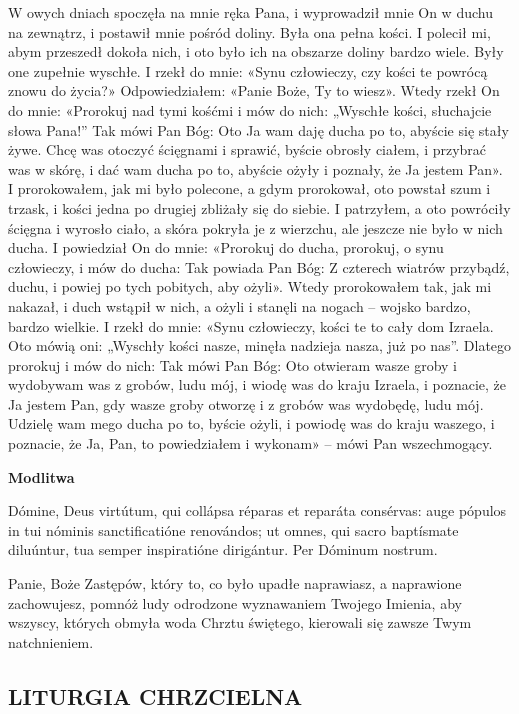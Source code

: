 \documentclass[10pt,a5paper]{book}
\newcommand{\oremus}[3]{\medskip\centerline{\textbf{#1}}\medskip
	\begin{sloppypar}
		\begin{paracol}{2}
			\setlength{\columnsep}{0em}
			\begin{leftcolumn}
				#2
			\end{leftcolumn}
			\begin{rightcolumn}
				#3
			\end{rightcolumn}
		\end{paracol}
	\end{sloppypar}}
\begin{document}
				W owych dniach spoczęła na mnie ręka Pana, i wyprowadził mnie On w duchu na zewnątrz, i postawił mnie pośród doliny. Była ona pełna kości. I polecił mi, abym przeszedł dokoła nich, i oto było ich na obszarze doliny bardzo wiele. Były one zupełnie wyschłe. I rzekł do mnie: «Synu człowieczy, czy kości te powrócą znowu do życia?» Odpowiedziałem: «Panie Boże, Ty to wiesz». Wtedy rzekł On do mnie: «Prorokuj nad tymi kośćmi i mów do nich: „Wyschłe kości, słuchajcie słowa Pana!” Tak mówi Pan Bóg: Oto Ja wam daję ducha po to, abyście się stały żywe. Chcę was otoczyć ścięgnami i sprawić, byście obrosły ciałem, i przybrać was w skórę, i dać wam ducha po to, abyście ożyły i poznały, że Ja jestem Pan». 
				I prorokowałem, jak mi było polecone, a gdym prorokował, oto powstał szum i trzask, i kości jedna po drugiej zbliżały się do siebie. I patrzyłem, a oto powróciły ścięgna i wyrosło ciało, a skóra pokryła je z wierzchu, ale jeszcze nie było w nich ducha. I powiedział On do mnie: «Prorokuj do ducha, prorokuj, o synu człowieczy, i mów do ducha: Tak powiada Pan Bóg: Z czterech wiatrów przybądź, duchu, i powiej po tych pobitych, aby ożyli».
				Wtedy prorokowałem tak, jak mi nakazał, i duch wstąpił w nich, a ożyli i stanęli na nogach – wojsko bardzo, bardzo wielkie. I rzekł do mnie: «Synu człowieczy, kości te to cały dom Izraela. Oto mówią oni: „Wyschły kości nasze, minęła nadzieja nasza, już po nas”. Dlatego prorokuj i mów do nich: Tak mówi Pan Bóg: Oto otwieram wasze groby i wydobywam was z grobów, ludu mój, i wiodę was do kraju Izraela, i poznacie, że Ja jestem Pan, gdy wasze groby otworzę i z grobów was wydobędę, ludu mój. Udzielę wam mego ducha po to, byście ożyli, i powiodę was do kraju waszego, i poznacie, że Ja, Pan, to powiedziałem i wykonam» – mówi Pan wszechmogący.
				
				\oremus{Modlitwa}{
					Dómine, Deus virtútum, qui collápsa réparas et reparáta consérvas: auge pópulos in tui nóminis sanctificatióne renovándos; ut omnes, qui sacro	baptísmate diluúntur, tua semper inspiratióne dirigántur. Per	Dóminum nostrum.}{
					Panie, Boże Zastępów, który to, co było upadłe naprawiasz, a naprawione zachowujesz, pomnóż ludy odrodzone wyznawaniem Twojego Imienia, aby wszyscy, których obmyła woda Chrztu świętego, kierowali się zawsze Twym natchnieniem.}
				
				\vfill
				
				\centerline{}
				
				\vfill
			
			\subsection{LITURGIA CHRZCIELNA}
				
\end{document}
